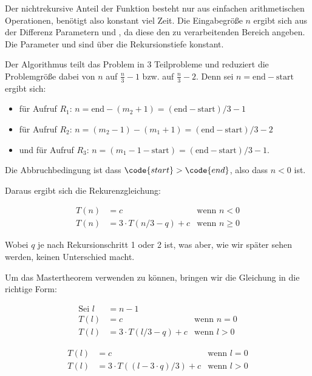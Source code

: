 \documentclass[parskip=half,a4paper]{scrartcl}
\begin{document}
Der nichtrekursive Anteil der Funktion besteht nur aus einfachen arithmetischen Operationen, benötigt also konstant  viel Zeit. Die Eingabegröße $n$ ergibt sich aus der Differenz Parametern  und , da diese den zu verarbeitenden Bereich angeben. Die Parameter  und  sind über die Rekursionstiefe konstant. 

Der Algorithmus teilt das Problem in 3 Teilprobleme und reduziert die Problemgröße dabei von $n$ auf $\frac{n}{3} - 1$ bzw. auf $\frac{n}{3} - 2$. Denn sei $n = \text{end} - \text{start}$ ergibt sich:
\begin{itemize}
	\item für Aufruf $R_1$: $n = \text{end} - (m_2 + 1) = (\text{end} -
	\text{start}) / 3 - 1$
	
	\item für Aufruf $R_2$: $n = (m_2 - 1) - (m_1 + 1) = (\text{end} - \text{start}) / 3 - 2$
	\item und für Aufruf $R_3$: $n = (m_1 - 1 - \text{start}) = (\text{end} - \text{start}) / 3 - 1$.
\end{itemize}

Die Abbruchbedingung ist dass $\code{start} > \code{end}$, also dass $n < 0$ ist.

Daraus ergibt sich die Rekurenzgleichung:

\begin{equation}
\begin{aligned}
T(n) & = c & \text{wenn $n < 0$}  \\
T(n) & = 3 \cdot T(n / 3 - q) + c & \text{wenn $n ≥ 0$} 
\end{aligned}
\end{equation}

Wobei $q$ je nach Rekursionschritt 1 oder 2 ist, was aber, wie wir später sehen werden, keinen Unterschied macht.

Um das Mastertheorem verwenden zu können, bringen wir die Gleichung in die richtige Form:


\begin{equation}
\begin{aligned}
\text{Sei $l$} & = n - 1&\\
T(l) & = c & \text{wenn $n = 0$}  \\
T(l) & = 3 \cdot T(l / 3 - q) + c & \text{wenn $l > 0$} 
\end{aligned}
\end{equation}

\begin{equation}
\begin{aligned}
T(l) & = c & \text{wenn $l = 0$} \\
T(l) & = 3 \cdot T((l - 3 \cdot q) / 3) + c & \text{wenn $l > 0$} 
\end{aligned}
\end{equation}
\end{document}
